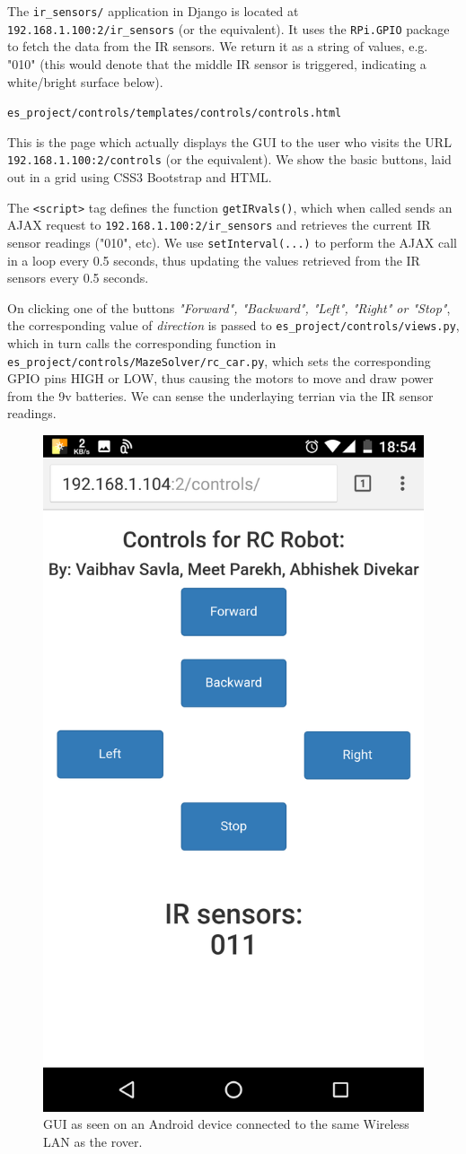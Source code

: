 \begin{description}[font=\quad $\circ$, topsep=6pt, itemsep=3em]
			The \texttt{ir\_sensors/} application in Django is located at \texttt{192.168.1.100:2/ir\_sensors} (or the equivalent). It uses the \texttt{RPi.GPIO} package to fetch the data from the IR sensors. We return it as a string of values, e.g. "010" (this would denote that the middle IR sensor is triggered, indicating a white/bright surface below).
		
		
		
	
		\item \texttt{es\_project/controls/templates/controls/controls.html}
			
		
		This is the page which actually displays the GUI to the user who visits the URL  \texttt{192.168.1.100:2/controls} (or the equivalent). We show the basic buttons, laid out in a grid using CSS3 Bootstrap and HTML. 
		
		The \texttt{<script>} tag defines the function \texttt{getIRvals()}, which when called sends an AJAX request to \texttt{192.168.1.100:2/ir\_sensors} and retrieves the current IR sensor readings ("010", etc). We use \texttt{setInterval(...)} to perform the AJAX call in a loop every 0.5 seconds, thus updating the values retrieved from the IR sensors every 0.5 seconds.
		
		On clicking one of the buttons \textit{"Forward", "Backward", "Left", "Right" or "Stop"}, the corresponding value of \textit{direction} is passed to \texttt{es\_project/controls/views.py}, which in turn calls the corresponding function in \texttt{es\_project/controls/MazeSolver/rc\_car.py}, which sets the corresponding GPIO pins HIGH or LOW, thus causing the motors to move and draw power from the 9v batteries. We can sense the underlaying terrian via the IR sensor readings.
		
		
		\begin{figure}
			\centering
			\includegraphics[width=0.4\linewidth]{"GUI_on_mobile.png"}
			\caption{GUI as seen on an Android device connected to the same Wireless LAN as the rover.}
			\label{fig:GUI_on_mobile}
		\end{figure}			
			

\end{description}
